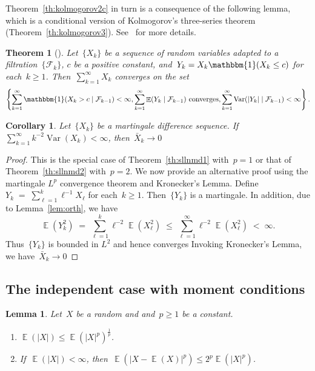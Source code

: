 \documentclass[12pt,a4paper]{article}  %
\newcounter{cite}
\newtheorem{theorem}{Theorem}[section]
\newtheorem{corollary}{Corollary}[section]
\newtheorem{lemma}{Lemma}[section]
\theoremstyle{definition}
\numberwithin{equation}{section}
\newcommand{\ind}{\mathbbm{1}}
\newcommand{\FF}{\mathcal{F}}
\newcommand{\as}{{\text{a.s.}}\xspace}
\DeclareMathOperator{\var}{Var}
\DeclareMathOperator{\expc}{\mathbb{E}}
\begin{document}
Theorem~\ref{th:kolmogorov2c} in turn is a consequence of the following lemma, which is a conditional
version of Kolmogorov's three-series theorem (Theorem~\ref{th:kolmogorov3}). See~\cite[pages~33-36]{Hall_Heyde_1980}
for more details.

\begin{theorem}[\mbox{\cite[Theorem~2.16]{Hall_Heyde_1980}}]
    \label{th:kolmogorov3c}
    Let~$\{X_k\}$ be a sequence of random variables adapted to a filtration~$\{\FF_k\}$, $c$ be a
    positive constant, and~$Y_k = X_k\ind(X_k \le c)$ for each~$k\ge 1$. Then~$\sum_{k=1}^\infty X_k$
    converges \as on the set
    \[
        \left\{
            \sum_{k=1}^\infty \ind(X_k > c \mathrel{|} \FF_{k-1}) < \infty,
            \sum_{k=1}^\infty \expc(Y_k \mathrel{|} \FF_{k-1})~\text{converges},
            \sum_{k=1}^\infty \var(|Y_k| \mathrel{|} \FF_{k-1}) < \infty
        \right\}.
    \]
\end{theorem}

\begin{corollary}
    \label{coro:mdl2}
    Let~$\{X_k\}$ be a martingale difference sequence. If~$\sum_{k=1}^\infty k^{-2}\var(X_k) < \infty$,
    then~$\bar{X}_k \to 0$ \as
\end{corollary}

\begin{proof}
    This is the special case of Theorem~\ref{th:sllnmd1} with~$p=1$
    or that of Theorem~\ref{th:sllnmd2} with~$p=2$.
    We now provide an alternative proof using the martingale $L^p$ convergence theorem and
    Kronecker's Lemma.
    Define~$Y_k \;=\;  \sum_{\ell=1}^k \ell^{-1}X_\ell$ for each~$k\ge 1$. Then~$\{Y_k\}$ is
    a martingale. In addition, due to Lemma~\ref{lem:orth}, we have
    \[
        \expc(Y_k^2) \;=\; \sum_{\ell=1}^k \ell^{-2}\expc(X_\ell^2) \;\le\; \sum_{\ell=1}^\infty \ell^{-2}
        \expc(X_\ell^2) \;<\; \infty.
    \]
    Thus~$\{Y_k\}$ is bounded in $L^2$ and hence converges \as
    Invoking Kronecker's Lemma, we have~$\bar{X}_k \to 0$ \as
\end{proof}


\subsection{The independent case with moment conditions}
\label{sec:sllnindep}

\begin{lemma}
    \label{lem:expc}
    Let~$X$ be a random and and~$p \ge 1$ be a constant.
    \begin{enumerate}
        \item $\expc(|X|) \le \expc(|X|^p)^{\frac{1}{p}}$.
        \item If~$\expc(|X|) < \infty$, then~$\expc(|X - \expc(X)|^p)\le 2^p \expc(|X|^p)$.
    \end{enumerate}
\end{lemma}
\end{document}
